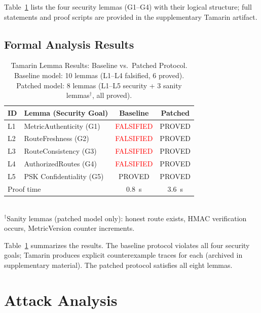 \documentclass[preprint,12pt]{elsarticle}
\begin{document}
Table~\ref{tab:tamarin} lists the four security lemmas (G1--G4) with their logical structure; full statements and proof scripts are provided in the supplementary Tamarin artifact.

\subsection{Formal Analysis Results}

\begin{table}[t]
  \centering
  \caption{Tamarin Lemma Results: Baseline vs.\ Patched Protocol.
    Baseline model: 10 lemmas (L1--L4 falsified, 6 proved).
    Patched model: 8 lemmas (L1--L5 security + 3 sanity lemmas$^\dagger$, all proved).}
  \label{tab:tamarin}
  \begin{tabular}{llcc}
    \toprule
    \textbf{ID} & \textbf{Lemma (Security Goal)} &
      \textbf{Baseline} & \textbf{Patched} \\
    \midrule
    L1 & MetricAuthenticity (G1)   & \textcolor{red}{FALSIFIED} & \textcolor{green!60!black}{PROVED} \\
    L2 & RouteFreshness (G2)       & \textcolor{red}{FALSIFIED} & \textcolor{green!60!black}{PROVED} \\
    L3 & RouteConsistency (G3)     & \textcolor{red}{FALSIFIED} & \textcolor{green!60!black}{PROVED} \\
    L4 & AuthorizedRoutes (G4)     & \textcolor{red}{FALSIFIED} & \textcolor{green!60!black}{PROVED} \\
    L5 & PSK Confidentiality (G5)  & \textcolor{green!60!black}{PROVED}  & \textcolor{green!60!black}{PROVED} \\
    \midrule
    \multicolumn{2}{l}{Proof time} & 0.8~s & 3.6~s \\
    \bottomrule
  \end{tabular}\\[2pt]
  \small $^\dagger$Sanity lemmas (patched model only): honest route exists,
    HMAC verification occurs, MetricVersion counter increments.
\end{table}

Table~\ref{tab:tamarin} summarizes the results. The baseline protocol
violates all four security goals; Tamarin produces explicit
counterexample traces for each (archived in supplementary material).
The patched protocol satisfies all eight lemmas.

\section{Attack Analysis}
\label{sec:attacks}
\end{document}
